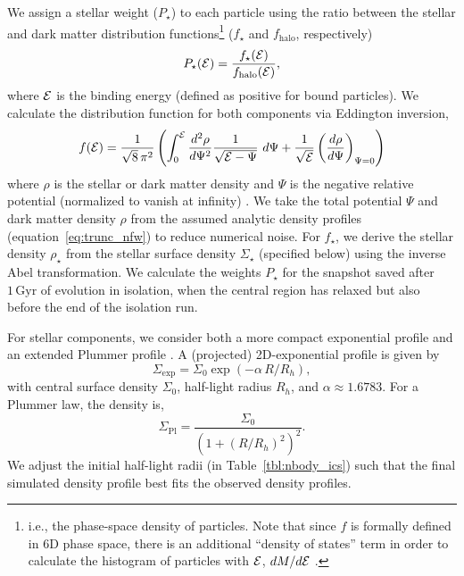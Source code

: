 \documentclass[linenumbers, twocolumn, twocolappendix]{aastex701}
\newcommand{\Gyr}{\text{Gyr}}
\begin{document}
We assign a stellar weight ($P_\star$) to each particle using the ratio between the stellar and dark matter distribution functions\footnote{
    i.e., the phase-space density of particles. Note that since $f$ is formally
    defined in 6D phase space, there is an additional ``density of states''
    term in order to calculate the histogram of particles with ${\cal E}$,
    $dM/d{\cal E}$ \citep[section 4.4.5,][]{BT1987}.
}  ($f_\star$ and $f_\text{halo}$, respectively)
\begin{equation}
    P_\star({\cal E}) = \frac{f_\star({\cal E})}{f_\text{halo}({\cal E})},
\end{equation}
where $\cal{E}$ is the binding energy (defined as positive for bound particles).
We calculate the distribution function for both components via Eddington inversion, \begin{equation}{
    f({\cal E}) = \frac{1}{\sqrt{8}\, \pi^2}\left( \int_0^{\cal E} \frac{d^2\rho}{d\Psi^2} \frac{1}{\sqrt{{\cal E} - \Psi}}\ d\Psi + \frac{1}{\sqrt{\cal E}} \left(\frac{d\rho}{d\Psi}\right)_{\Psi=0} \right)
}
\end{equation} 
where $\rho$ is the stellar or dark matter density and $\Psi$ is the negative relative potential (normalized to vanish at infinity)  \citep[see eq. 4-140b in][]{BT1987}. 
We take the total potential $\Psi$ and dark matter density $\rho$ from the assumed analytic density profiles (equation~\ref{eq:trunc_nfw}) to reduce numerical noise. For $f_\star$, we derive the stellar density $\rho_\star$ from the stellar surface density $\Sigma_\star$ (specified below) using the inverse Abel transformation. We calculate the weights $P_\star$ for the snapshot saved after $1\,\Gyr$ of evolution in isolation, when the central region has relaxed but also before the end of the isolation run. 

For stellar components, we consider both a more compact exponential profile and an extended Plummer profile \citep{plummer1911}.  
A (projected) 2D-exponential profile is given by 
\begin{equation}\label{eq:exponential_law}
\Sigma_\text{exp} = \Sigma_0\exp(-\alpha\,R / R_h),
\end{equation}
with central surface density $\Sigma_0$, half-light radius $R_h$, and $\alpha \approx 1.6783$.
For a Plummer law, the density is,
\begin{equation}
\Sigma_\text{Pl} = \frac{\Sigma_0}{(1 + (R/R_h)^2)^2}. \label{EqPlummer}
\end{equation}
We adjust the initial half-light radii (in Table~\ref{tbl:nbody_ics}) such that the final simulated density profile best fits the observed density profiles.
\end{document}
